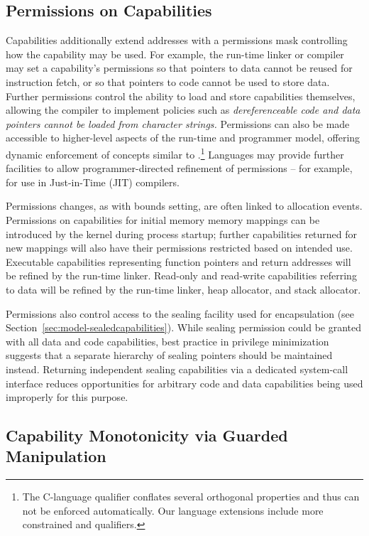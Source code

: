 \subsection{Permissions on Capabilities}
\label{sec:model-permissions}
Capabilities additionally extend addresses with a permissions mask controlling how the
capability may be used.
For example, the run-time linker or compiler may set a capability's
permissions so that pointers to data cannot be reused for instruction fetch,
or so that pointers to code cannot be used to store data.
Further permissions control the ability to load and store capabilities
themselves, allowing the compiler to implement policies such as 
\textit{dereferenceable code and data pointers cannot be loaded from character
strings.}
Permissions can also be made accessible to higher-level aspects of the
run-time and programmer model, offering dynamic enforcement of concepts
similar to .\footnote{The C-language  qualifier
conflates several orthogonal properties and thus can not be enforced
automatically.
Our language extensions include more constrained  and
 qualifiers.}
Languages may provide further facilities to allow programmer-directed
refinement of permissions -- for example, for use in Just-in-Time (JIT)
compilers.

Permissions changes, as with bounds setting, are often linked to allocation
events.
Permissions on capabilities for initial memory memory mappings can be
introduced by the kernel during process startup; further capabilities returned
for new mappings will also have their permissions restricted based on intended
use.
Executable capabilities representing function pointers and return addresses
will be refined by the run-time linker.
Read-only and read-write capabilities referring to data will be refined by the
run-time linker, heap allocator, and stack allocator.

Permissions also control access to the sealing facility used for encapsulation
(see Section~\ref{sec:model-sealedcapabilities}).
While sealing permission could be granted with all data and code capabilities,
best practice in privilege minimization suggests that a separate hierarchy
of sealing pointers should be maintained instead.
Returning independent sealing capabilities via a dedicated system-call
interface reduces opportunities for arbitrary code and data capabilities being
used improperly for this purpose.

\subsection{Capability Monotonicity via Guarded Manipulation}
\label{sec:model-monotonicity}

